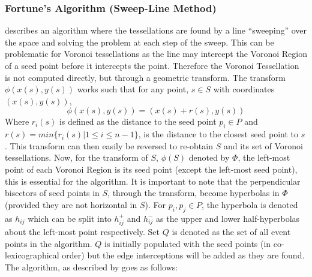 \subsubsection{Fortune's Algorithm (Sweep-Line Method)}\label{tes:ssec:fort}
\cite{fortune1987sweepline} describes an algorithm where the tessellations are found by a line ``sweeping'' over the space and solving the problem at each step of the sweep. This can be problematic for Voronoi tessellations as the line may intercept the Voronoi Region of a seed point before it intercepts the point. Therefore the Voronoi Tessellation is not computed directly, but through a geometric transform. The transform $\phi(x(s),y(s))$ works such that for any point, $s \in S$ with coordinates $(x(s),y(s))$, 
\begin{equation}
  \phi(x(s),y(s)) = (x(s) + r(s), y(s))
\end{equation}
Where $r_i(s)$ is defined as the distance to the seed point $p_i \in P$ and $r(s) = min\{r_i(s) | 1 \leq i \leq n-1\}$, is the distance to the closest seed point to $s$. This transform can then easily be reversed to re-obtain $S$ and its set of Voronoi tessellations. Now, for the transform of $S$, $\phi(S)$ denoted by $\Phi$, the left-most point of each Voronoi Region is its seed point (except the left-most seed point), this is essential for the algorithm. It is important to note that the perpendicular bisectors of seed points in $S$, through the transform, become hyperbolas in $\Phi$ (provided they are not horizontal in $S$). For $p_i,p_j\in P$, the hyperbola is denoted as $h_{ij}$ which can be split into $h^+_{ij}$ and $h^-_{ij}$ as the upper and lower half-hyperbolas about the left-most point respectively. Set $Q$ is denoted as the set of all event points in the algorithm. $Q$ is initially populated with the seed points (in co-lexicographical order) but the edge interceptions will be added as they are found. The algorithm, as described by \cite{okabe2009spatial} goes as follows:
